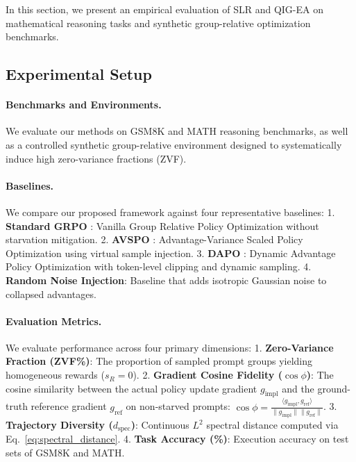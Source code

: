 \documentclass{article}
\newcommand{\grpo}{\textsc{GRPO}\xspace}
\newcommand{\zvf}{\textsc{ZVF}\xspace}
\newcommand{\slr}{\textsc{SLR}\xspace}
\newcommand{\qigea}{\textsc{QIG-EA}\xspace}
\begin{document}
In this section, we present an empirical evaluation of \slr and \qigea on mathematical reasoning tasks and synthetic group-relative optimization benchmarks.

\subsection{Experimental Setup}
\label{subsec:exp_setup}

\paragraph{Benchmarks and Environments.}
We evaluate our methods on GSM8K \citep{cobbe2021gsm8k} and MATH \citep{hendrycks2021math} reasoning benchmarks, as well as a controlled synthetic group-relative environment designed to systematically induce high zero-variance fractions (\zvf).

\paragraph{Baselines.}
We compare our proposed framework against four representative baselines:
1. \textbf{Standard \grpo} \citep{shao2024deepseekmath}: Vanilla Group Relative Policy Optimization without starvation mitigation.
2. \textbf{AVSPO} \citep{he2026advantage}: Advantage-Variance Scaled Policy Optimization using virtual sample injection.
3. \textbf{DAPO} \citep{yu2025dapo}: Dynamic Advantage Policy Optimization with token-level clipping and dynamic sampling.
4. \textbf{Random Noise Injection}: Baseline that adds isotropic Gaussian noise to collapsed advantages.

\paragraph{Evaluation Metrics.}
We evaluate performance across four primary dimensions:
1. \textbf{Zero-Variance Fraction (\zvf \%)}: The proportion of sampled prompt groups yielding homogeneous rewards ($s_R = 0$).
2. \textbf{Gradient Cosine Fidelity ($\cos\phi$)}: The cosine similarity between the actual policy update gradient $g_{\text{impl}}$ and the ground-truth reference gradient $g_{\text{ref}}$ on non-starved prompts: $\cos\phi = \frac{\langle g_{\text{impl}}, g_{\text{ref}} \rangle}{\|g_{\text{impl}}\| \|g_{\text{ref}}\|}$.
3. \textbf{Trajectory Diversity ($d_{\text{spec}}$)}: Continuous $L^2$ spectral distance computed via Eq.~\eqref{eq:spectral_distance}.
4. \textbf{Task Accuracy (\%)}: Execution accuracy on test sets of GSM8K and MATH.
\end{document}
